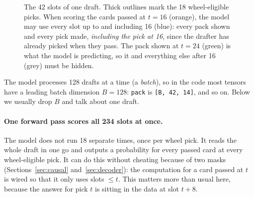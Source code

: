 \documentclass[11pt,letterpaper]{article}
\newcommand{\code}[1]{\texttt{\small #1}}
\newcommand{\shape}[1]{\texttt{\footnotesize[#1]}}
\begin{document}
\begin{figure}[!htbp]
\centering
{}
\caption{The 42 slots of one draft. Thick outlines mark the 18 wheel-eligible picks. When scoring the cards
passed at $t=16$ (orange), the model may use every slot up to and including 16 (blue): every pack shown and
every pick made, \emph{including the pick at 16}, since the drafter has already picked when they pass. The
pack shown at $t=24$ (green) is what the model is predicting, so it and everything else after 16 (grey) must be
hidden.}
\label{fig:grid}
\end{figure}

The model processes 128 drafts at a time (a \emph{batch}), so in the code most tensors have a leading
batch dimension $B=128$: \code{pack} is \shape{B, 42, 14}, and so on. Below we usually drop $B$ and talk
about one draft.

\paragraph{One forward pass scores all 234 slots at once.} The model does not run 18 separate times, once per
wheel pick. It reads the whole draft in one go and outputs a probability for every passed card at every
wheel-eligible pick. It can do this without cheating because of two masks (Sections~\ref{sec:causal}
and~\ref{sec:decoder}): the computation for a card passed at $t$ is wired so that it only uses slots $\le t$.
This matters more than usual here, because the answer for pick $t$ is sitting in the data at slot $t+8$.
\end{document}
